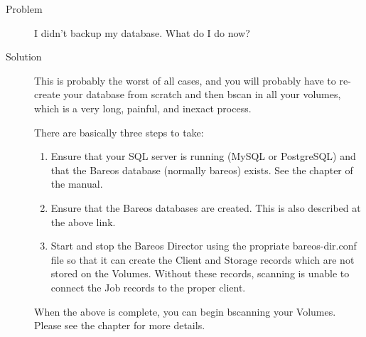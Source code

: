 \begin{description}
\item[Problem]
  I didn't backup my database. What do I do now?
\item[Solution]
  This is probably the worst of all cases, and you will probably have
  to re-create your database from scratch and then bscan in all your
  volumes, which is a very long, painful, and inexact process.

There are basically three steps to take:

\begin{enumerate}
\item Ensure that your SQL server is running (MySQL or PostgreSQL)
   and that the Bareos database (normally bareos) exists.  See the
    chapter of the manual.
\item Ensure that the Bareos databases are created. This is also
   described at the above link.
\item Start and stop the Bareos Director using the propriate
   bareos-dir.conf file so that it can create the Client and
   Storage records which are not stored on the Volumes.  Without these
   records, scanning is unable to connect the Job records to the proper
  client.
\end{enumerate}

When the above is complete, you can begin bscanning your Volumes. Please
see the  chapter for more details.

\end{description}
